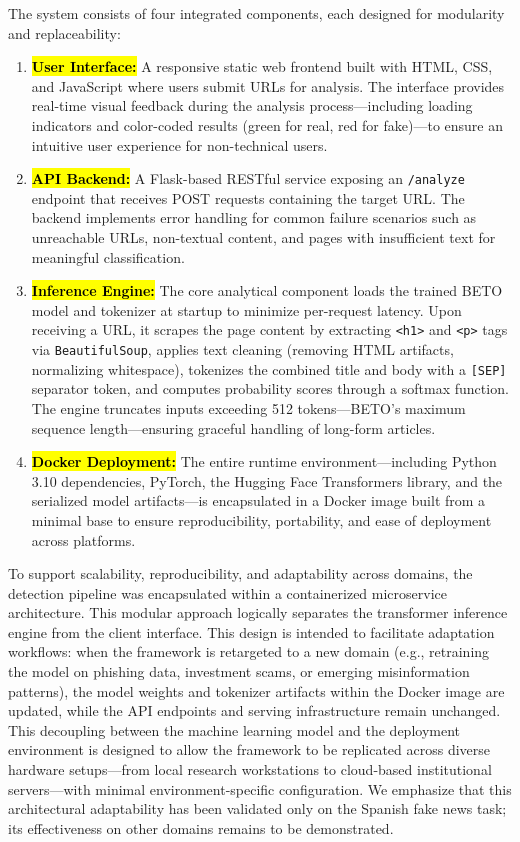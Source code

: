 \documentclass[informatics,article,accept,pdftex,moreauthors]{Definitions/mdpi}
\begin{document}
The system consists of four integrated components, each designed for modularity and replaceability:
\begin{enumerate}[leftmargin=*,labelsep=5mm]

    \item \textbf{\hl{User Interface:}} A responsive static web frontend built with HTML, CSS, and JavaScript where users submit URLs for analysis. The interface provides real-time visual feedback during the analysis process—including loading indicators and color-coded results (green for real, red for fake)—to ensure an intuitive user experience for non-technical users.
    \item \textbf{\hl{API Backend:}} A Flask-based RESTful service exposing an \texttt{/analyze} endpoint that receives POST requests containing the target URL. The backend implements error handling for common failure scenarios such as unreachable URLs, non-textual content, and pages with insufficient text for meaningful classification.
    \item \textbf{\hl{Inference Engine:}} The core analytical component loads the trained BETO model and tokenizer at startup to minimize per-request latency. Upon receiving a URL, it scrapes the page content by extracting \texttt{<h1>} and \texttt{<p>} tags via \texttt{BeautifulSoup}, applies text cleaning (removing HTML artifacts, normalizing whitespace), tokenizes the combined title and body with a \texttt{[SEP]} separator token, and computes probability scores through a softmax function. The engine truncates inputs exceeding 512 tokens—BETO's maximum sequence length—ensuring graceful handling of long-form articles.
    \item \textbf{\hl{Docker Deployment:}} The entire runtime environment—including Python 3.10 dependencies, PyTorch, the Hugging Face Transformers library, and the serialized model artifacts—is encapsulated in a Docker image built from a minimal base to ensure reproducibility, portability, and ease of deployment across platforms.
\end{enumerate}

To support scalability, reproducibility, and adaptability across domains, the detection pipeline was encapsulated within a containerized microservice architecture. This modular approach logically separates the transformer inference engine from the client interface. This design is intended to facilitate adaptation workflows: when the framework is retargeted to a new domain (e.g., retraining the model on phishing data, investment scams, or emerging misinformation patterns), the model weights and tokenizer artifacts within the Docker image are updated, while the API endpoints and serving infrastructure remain unchanged. This decoupling between the machine learning model and the deployment environment is designed to allow the framework to be replicated across diverse hardware setups—from local research workstations to cloud-based institutional servers—with minimal environment-specific configuration. We emphasize that this architectural adaptability has been validated only on the Spanish fake news task; its effectiveness on other domains remains to be demonstrated.
\end{document}
